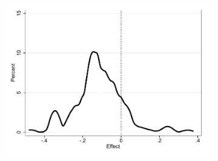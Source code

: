 \documentclass[oneside,11pt]{article}
\begin{document}
\begin{figure}[H]
\begin{center}
\begin{subfigure}{0.42\textwidth}
        \includegraphics[width=\textwidth]{Figuras/he_dist_def_c_pro_2.pdf}
    \end{subfigure}

    \end{center}
        \scriptsize 
        
\end{figure}

\vspace{3ex}
\end{document}
